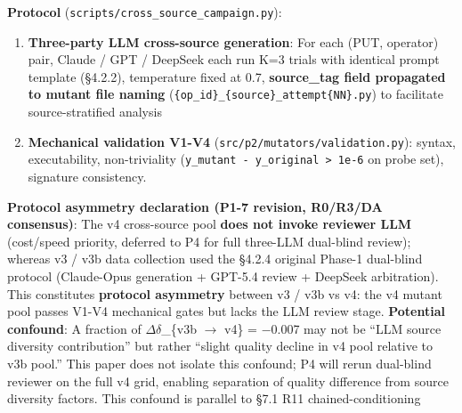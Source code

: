 \documentclass[review,12pt,authoryear]{elsarticle}
\begin{document}
\textbf{Protocol} (\texttt{scripts/cross\_source\_campaign.py}):

\begin{enumerate}
\def\labelenumi{(\alph{enumi})}
\item
  \textbf{Three-party LLM cross-source generation}: For each (PUT,
  operator) pair, Claude / GPT / DeepSeek each run K=3 trials with
  identical prompt template (§4.2.2), temperature fixed at 0.7,
  \textbf{source\_tag field propagated to mutant file naming}
  (\texttt{\{op\_id\}\_\{source\}\_attempt\{NN\}.py}) to facilitate
  source-stratified analysis
\item
  \textbf{Mechanical validation V1-V4}
  (\texttt{src/p2/mutators/validation.py}): syntax, executability,
  non-triviality
  (\texttt{\textbar{}y\_mutant\ -\ y\_original\textbar{}\ \textgreater{}\ 1e-6}
  on probe set), signature consistency.
\end{enumerate}

\textbf{Protocol asymmetry declaration (P1-7 revision, R0/R3/DA
consensus)}: The v4 cross-source pool \textbf{does not invoke reviewer
LLM} (cost/speed priority, deferred to P4 for full three-LLM dual-blind
review); whereas v3 / v3b data collection used the §4.2.4 original
Phase-1 dual-blind protocol (Claude-Opus generation + GPT-5.4 review +
DeepSeek arbitration). This constitutes \textbf{protocol asymmetry}
between v3 / v3b vs v4: the v4 mutant pool passes V1-V4 mechanical gates
but lacks the LLM review stage. \textbf{Potential confound}: A fraction
of $\Delta$$\delta$\_\{v3b $\to$ v4\} = −0.007 may not be ``LLM source diversity
contribution'' but rather ``slight quality decline in v4 pool relative
to v3b pool.'' This paper does not isolate this confound; P4 will rerun
dual-blind reviewer on the full v4 grid, enabling separation of quality
difference from source diversity factors. This confound is parallel to
§7.1 R11 chained-conditioning
\end{document}

